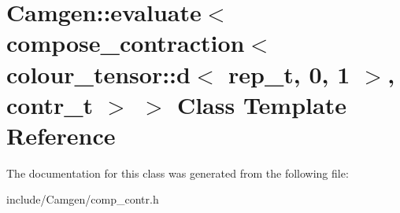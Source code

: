 \hypertarget{a00153}{}\section{Camgen\+:\+:evaluate$<$ compose\+\_\+contraction$<$ colour\+\_\+tensor\+:\+:d$<$ rep\+\_\+t, 0, 1 $>$, contr\+\_\+t $>$ $>$ Class Template Reference}
\label{a00153}


The documentation for this class was generated from the following file\+:\begin{DoxyCompactItemize}
\item 
include/\+Camgen/comp\+\_\+contr.\+h\end{DoxyCompactItemize}
